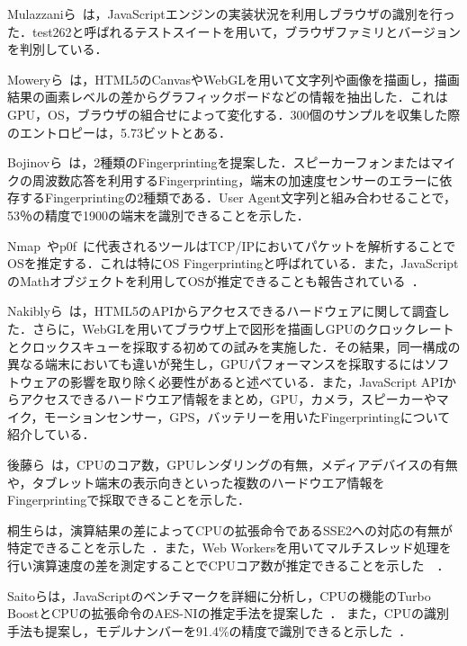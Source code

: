 Mulazzaniら~\cite{mulazzani2013fast}は，JavaScriptエンジンの実装状況を利用しブラウザの識別を行った．test262と呼ばれるテストスイートを用いて，ブラウザファミリとバージョンを判別している．

Moweryら~\cite{mowery2012pixel}は，HTML5のCanvasやWebGLを用いて文字列や画像を描画し，描画結果の画素レベルの差からグラフィックボードなどの情報を抽出した．これはGPU，OS，ブラウザの組合せによって変化する．300個のサンプルを収集した際のエントロピーは，5.73ビットとある．

Bojinovら~\cite{bojinov2014mobile}は，2種類のFingerprintingを提案した．スピーカーフォンまたはマイクの周波数応答を利用するFingerprinting，端末の加速度センサーのエラーに依存するFingerprintingの2種類である．User Agent文字列と組み合わせることで，53％の精度で1900の端末を識別できることを示した．

Nmap~\cite{nmap}やp0f~\cite{p0f}に代表されるツールはTCP/IPにおいてパケットを解析することでOSを推定する．これは特にOS Fingerprintingと呼ばれている．また，JavaScriptのMathオブジェクトを利用してOSが推定できることも報告されている~\cite{tor_bugtrack}．

Nakiblyら~\cite{nakibly2015hardware}は，HTML5のAPIからアクセスできるハードウェアに関して調査した．さらに，WebGLを用いてブラウザ上で図形を描画しGPUのクロックレートとクロックスキューを採取する初めての試みを実施した．その結果，同一構成の異なる端末においても違いが発生し，GPUパフォーマンスを採取するにはソフトウェアの影響を取り除く必要性があると述べている．また，JavaScript APIからアクセスできるハードウエア情報をまとめ，GPU，カメラ，スピーカーやマイク，モーションセンサー，GPS，バッテリーを用いたFingerprintingについて紹介している．

後藤ら~\cite{後藤浩行2013web}は，CPUのコア数，GPUレンダリングの有無，メディアデバイスの有無や，タブレット端末の表示向きといった複数のハードウエア情報をFingerprintingで採取できることを示した．

桐生らは，演算結果の差によってCPUの拡張命令であるSSE2への対応の有無が特定できることを示した~\cite{桐生直輝2013cpu}．また，Web Workersを用いてマルチスレッド処理を行い演算速度の差を測定することでCPUコア数が推定できることを示した~~\cite{桐生直輝2014web}．

Saitoらは，JavaScriptのベンチマークを詳細に分析し，CPUの機能のTurbo BoostとCPUの拡張命令のAES-NIの推定手法を提案した~\cite{saito2016estimating}．
また，CPUの識別手法も提案し，モデルナンバーを91.4\%の精度で識別できると示した~\cite{saito2017web}．
